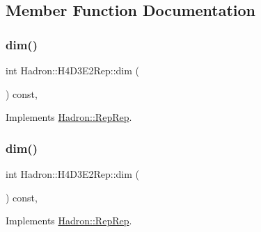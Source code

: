 \subsection{Member Function Documentation}
\mbox{\label{structHadron_1_1H4D3E2Rep_a893b03ad67a5405ffd75b792cc5fe6f1}} 
\subsubsection{\texorpdfstring{dim()}{dim()}\hspace{0.1cm}{\footnotesize\ttfamily [1/5]}}
{\footnotesize\ttfamily int Hadron\+::\+H4\+D3\+E2\+Rep\+::dim (\begin{DoxyParamCaption}{ }\end{DoxyParamCaption}) const\hspace{0.3cm}{\ttfamily [inline]}, {\ttfamily [virtual]}}



Implements \mbox{\hyperlink{structHadron_1_1RepRep_a92c8802e5ed7afd7da43ccfd5b7cd92b}{Hadron\+::\+Rep\+Rep}}.

\mbox{\label{structHadron_1_1H4D3E2Rep_a893b03ad67a5405ffd75b792cc5fe6f1}} 
\subsubsection{\texorpdfstring{dim()}{dim()}\hspace{0.1cm}{\footnotesize\ttfamily [2/5]}}
{\footnotesize\ttfamily int Hadron\+::\+H4\+D3\+E2\+Rep\+::dim (\begin{DoxyParamCaption}{ }\end{DoxyParamCaption}) const\hspace{0.3cm}{\ttfamily [inline]}, {\ttfamily [virtual]}}



Implements \mbox{\hyperlink{structHadron_1_1RepRep_a92c8802e5ed7afd7da43ccfd5b7cd92b}{Hadron\+::\+Rep\+Rep}}.

\mbox{\label{structHadron_1_1H4D3E2Rep_a893b03ad67a5405ffd75b792cc5fe6f1}} 
